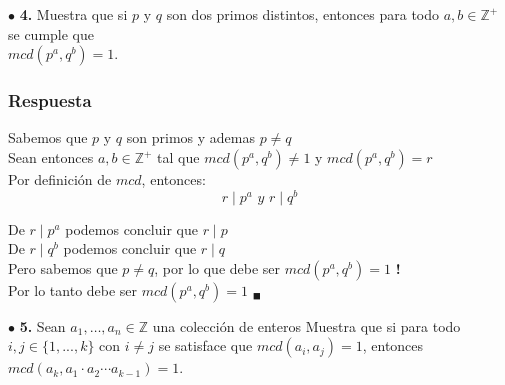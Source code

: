 \documentclass[12pt]{article}
\begin{document}
	\vspace{1cm}
	
	$\bullet$ \textbf{4.} Muestra que si $p$ y $q$ son dos primos distintos, entonces para todo $a, b \in \mathbb{Z}^+$ se cumple que\\
	$mcd(p^a, q^b) = 1$.
	\subsubsection*{Respuesta}
	Sabemos que $p$ y $q$ son primos y ademas $p \neq q$\\

	Sean entonces $a, b \in \mathbb{Z}^+$ tal que $mcd(p^a, q^b) \neq 1$ y $mcd(p^a, q^b) = r$\\

	Por definición de $mcd$, entonces:
	\[r \mid p^a \textit{ y } r \mid q^b\]
	
	De $r \mid p^a$ podemos concluir que $r \mid p$\\

	De $r \mid q^b$ podemos concluir que $r \mid q$\\

	Pero sabemos que $p \neq q$, por lo que debe ser $mcd(p^a, q^b) = 1$ \textbf{!}\\

	Por lo tanto debe ser $mcd(p^a, q^b) = 1$ $_\blacksquare$
	
	\vspace{1cm}
	
	$\bullet$ \textbf{5.} Sean $a_1, \dots, a_n \in \mathbb{Z}$ una colección de enteros Muestra que si para todo $i, j \in \{1, . . . , k \}$ 
	con $i \neq j$ se satisface que $mcd(a_i, a_j ) = 1$, entonces $mcd(a_k , a_1  \cdot a_2 \cdots a_{k-1}) = 1$.
	
\end{document}
